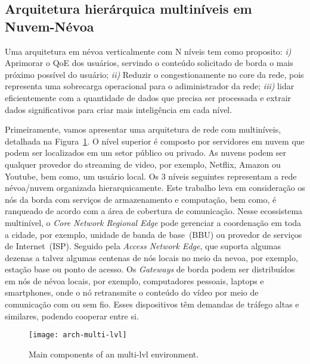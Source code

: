 \subsection{Arquitetura hierárquica multiníveis em Nuvem-Névoa}


Uma arquitetura em névoa verticalmente com N níveis tem como proposito: 
\textit{i)} Aprimorar o QoE dos usuários, servindo o conteúdo solicitado de borda o mais próximo possível do usuário;
\textit{ii)} Reduzir o congestionamente no core da rede, pois representa uma sobrecarga operacional para o adiministrador da rede;
\textit{iii)} lidar eficientemente com a quantidade de dados que precisa ser processada e extrair dados significativos para criar mais inteligência em cada nível. 
%

Primeiramente, vamos apresentar uma arquitetura de rede com multiníveis, detalhada na Figura~\ref{fig:arch-multi-lvl}. O nível superior é composto por servidores em nuvem que podem ser localizados em um setor público ou privado. As nuvens podem ser qualquer provedor do streaming de video, por exemplo, Netflix, Amazon ou Youtube, bem como, um usuário local. %
Os 3 níveis seguintes representam a rede névoa/nuvem organizada hierarquicamente. Este  trabalho leva em consideração os nós da borda com serviços de armazenamento e computação, bem como, é ranqueado de acordo com a área de cobertura de comunicação. Nesse ecossistema multinível, o \textit{Core Network Regional Edge} pode gerenciar a coordenação em toda a cidade, por exemplo, unidade de banda de base~(BBU) ou provedor de serviços de Internet~(ISP). Seguido pela \textit{Access Network Edge}, que suporta algumas dezenas a talvez algumas centenas de nós locais no meio da nevoa, por exemplo, estação base ou ponto de acesso. Os \textit{Gateways} de borda podem ser distribuídos em nós de névoa locais, por exemplo, computadores pessoais, laptops e smartphones, onde o nó retransmite o conteúdo do vídeo por meio de comunicação com ou sem fio. Esses dispositivos têm demandas de tráfego altas e similares, podendo cooperar entre si.%
\vspace{0.8cm}
\begin{figure}[htb]
  \centering
  \texttt{[image: arch-multi-lvl]}
  \caption{Main components of an multi-lvl environment.}
  \label{fig:arch-multi-lvl}
\end{figure}

